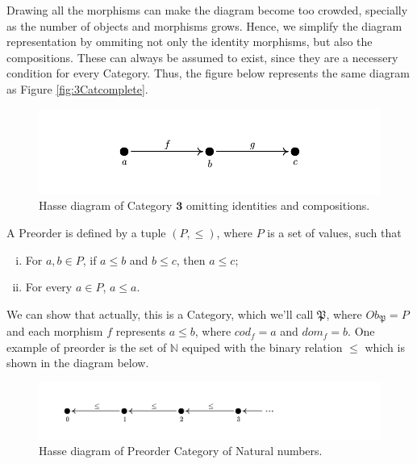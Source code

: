 \begin{example}
Drawing all the morphisms can make the diagram become too crowded, specially
as the number of objects and morphisms grows. Hence, we simplify the
diagram representation by ommiting not only the identity morphisms, but also
the compositions. These can always be assumed to exist, since they are a necessery
condition for every Category.
Thus, the figure below represents the same diagram as Figure \ref{fig:3Catcomplete}.

\begin{figure}[H]
  \begin{center}
    \includegraphics{./notebooks/3Catsimple}
  \end{center}
  \caption{Hasse diagram of Category $\bm 3$ omitting identities and compositions.}
  \label{fig:3Catsimple}
\end{figure}

\end{example}

\begin{example}[Preorders]
  A Preorder is defined by a tuple $(P, \leq)$, where $P$ is a set of values, such that
  \begin{enumerate}[(i)]
    \item For $a,b \in P$, if $a\leq b$ and $b \leq c$, then $a \leq c$;
    \item For every $a \in P$, $a \leq a$.
  \end{enumerate}
  We can show that actually, this is a Category, which we'll call $\mathfrak P$,
  where $Ob_\mathfrak P = P$ and each morphism $f$ represents $a \leq b$, where
  $cod_f = a$ and $dom_f = b$.
  One example of preorder is the set of $\mathbb N$ equiped with the binary relation $\leq$
  which is shown in the diagram below.

\begin{figure}[H]
  \begin{center}
    \includegraphics{./notebooks/NCat}
  \end{center}
  \caption{Hasse diagram of Preorder Category of Natural numbers.}
  \label{fig:NCat}
\end{figure}
\end{example}

